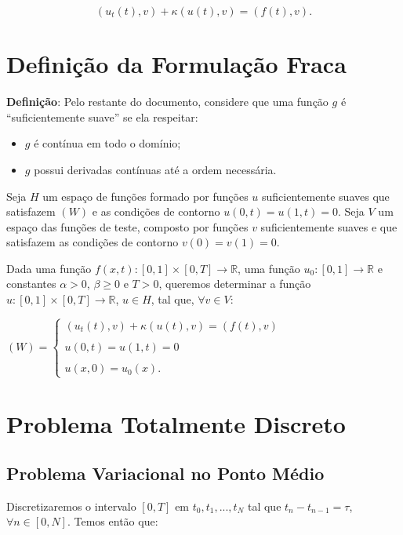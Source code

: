   \[(u_t(t), v) + \kappa(u(t), v) = (f(t), v).\]

\section{Definição da Formulação Fraca}

  \textbf{Definição}: Pelo restante do documento, considere que uma função $g$ é ``suficientemente suave'' se ela respeitar:
  \begin{itemize}
    \item $g$ é contínua em todo o domínio;
    \item $g$ possui derivadas contínuas até a ordem necessária.
  \end{itemize}

  Seja $H$ um espaço de funções formado por funções $u$ suficientemente suaves que satisfazem $(W)$ e as condições de contorno $u(0,t) = u(1,t) = 0$. Seja $V$ um espaço das funções de teste, composto por funções $v$ suficientemente suaves e que satisfazem as condições de contorno $v(0) = v(1) = 0$.

  Dada uma função $f(x,t) : [0,1] \times [0,T] \to \mathbb{R}$, uma função $u_0 : [0,1] \to \mathbb{R}$ e constantes $\alpha > 0$, $\beta \geq 0$ e $T > 0$, queremos determinar a função $u : [0,1] \times [0,T] \to \mathbb{R}$, $u \in H$, tal que, $\forall v \in V$:

  \begin{center}
    $(W) = \begin{cases}
      (u_t(t), v) + \kappa(u(t), v) = (f(t), v)\\ \\
      u(0,t) = u(1,t) = 0 \\ \\
      u(x,0) = u_0(x).
    \end{cases}$
  \end{center}


\section{Problema Totalmente Discreto}

\subsection{Problema Variacional no Ponto Médio}

  Discretizaremos o intervalo $[0,T]$ em $t_0, t_1, ..., t_N$ tal que $t_n - t_{n-1} = \tau$, $\forall n \in [0, N]$. Temos então que:


